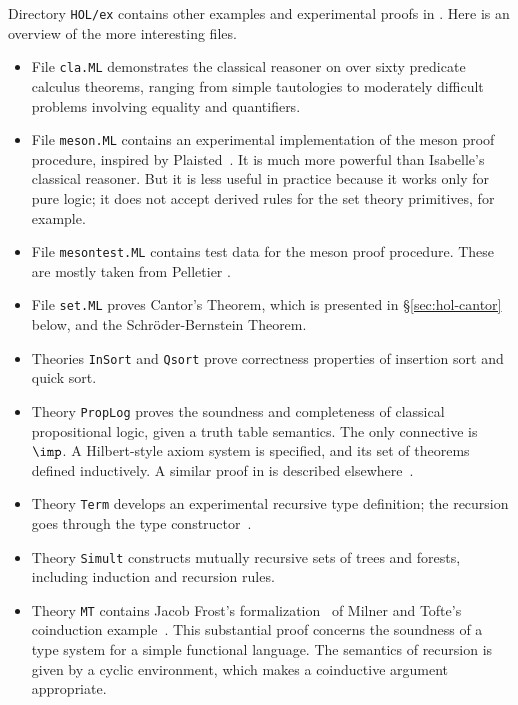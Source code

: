 Directory {\tt HOL/ex} contains other examples and experimental proofs in
{\HOL}.  Here is an overview of the more interesting files.
\begin{itemize}
\item File {\tt cla.ML} demonstrates the classical reasoner on over sixty
  predicate calculus theorems, ranging from simple tautologies to
  moderately difficult problems involving equality and quantifiers.

\item File {\tt meson.ML} contains an experimental implementation of the {\sc
    meson} proof procedure, inspired by Plaisted~\cite{plaisted90}.  It is
  much more powerful than Isabelle's classical reasoner.  But it is less
  useful in practice because it works only for pure logic; it does not
  accept derived rules for the set theory primitives, for example.

\item File {\tt mesontest.ML} contains test data for the {\sc meson} proof
  procedure.  These are mostly taken from Pelletier \cite{pelletier86}.

\item File {\tt set.ML} proves Cantor's Theorem, which is presented in
  \S\ref{sec:hol-cantor} below, and the Schr\"oder-Bernstein Theorem.

\item Theories {\tt InSort} and {\tt Qsort} prove correctness properties of
  insertion sort and quick sort.

\item Theory {\tt PropLog} proves the soundness and completeness of
  classical propositional logic, given a truth table semantics.  The only
  connective is $\imp$.  A Hilbert-style axiom system is specified, and its
  set of theorems defined inductively.  A similar proof in \ZF{} is
  described elsewhere~\cite{paulson-set-II}.

\item Theory {\tt Term} develops an experimental recursive type definition;
  the recursion goes through the type constructor~.

\item Theory {\tt Simult} constructs mutually recursive sets of trees and
  forests, including induction and recursion rules.

\item Theory {\tt MT} contains Jacob Frost's formalization~\cite{frost93} of
  Milner and Tofte's coinduction example~\cite{milner-coind}.  This
  substantial proof concerns the soundness of a type system for a simple
  functional language.  The semantics of recursion is given by a cyclic
  environment, which makes a coinductive argument appropriate.
\end{itemize}


